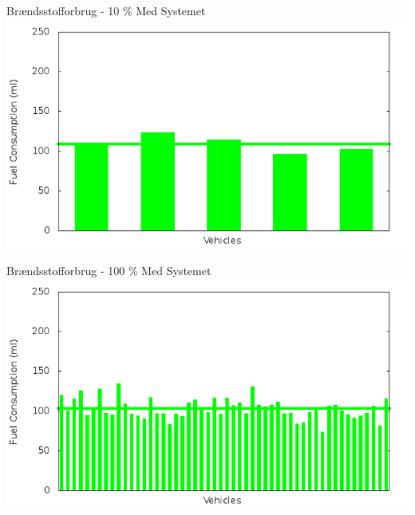 \begin{frame}{Brændsstofforbrug - 10 \% Med Systemet}
\includegraphics[width=1\textwidth]{images/fuelRouteControlled10.png}
\end{frame}

\begin{frame}{Brændsstofforbrug - 100 \% Med Systemet}
\includegraphics[width=1\textwidth]{images/fuelRouteControlled100.png}
\end{frame}

\begin{frame}
\end{frame}




